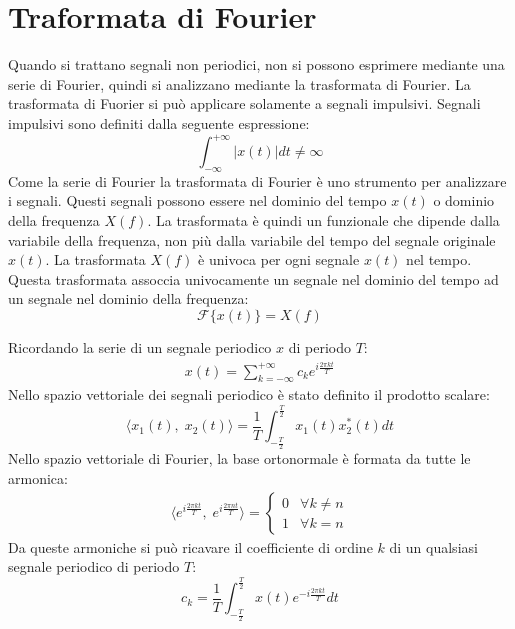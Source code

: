 \documentclass{article}
\numberwithin{equation}{subsection}
\begin{document}
\clearpage

\section{Traformata di Fourier}
Quando si trattano segnali non periodici, non si possono esprimere mediante una serie di Fourier, quindi si analizzano mediante la trasformata di Fourier. 
La trasformata di Fuorier si può applicare solamente a segnali impulsivi. Segnali impulsivi sono definiti dalla seguente espressione:
\begin{equation*}
    \displaystyle\int_{-\infty}^{+\infty}|x(t)|dt\neq\infty
\end{equation*}
Come la serie di Fourier la trasformata di Fourier è uno strumento per analizzare i segnali. Questi segnali possono essere nel dominio del tempo $x(t)$ o dominio 
della frequenza $X(f)$. La trasformata è quindi un funzionale che dipende dalla variabile della frequenza, non più dalla variabile del tempo del segnale originale $x(t)$. 
La trasformata $X(f)$ è univoca per ogni segnale $x(t)$ nel tempo. Questa trasformata assoccia univocamente un segnale nel dominio del tempo ad un segnale nel dominio della 
frequenza:   
\begin{equation*}
    \mathscr{F}\{x(t)\}=X(f)
\end{equation*}

Ricordando la serie di un segnale periodico $x$ di periodo $T$:
\begin{gather*}
    x(t)=\displaystyle\sum_{k=-\infty}^{+\infty}c_ke^{i\frac{2\pi kt}{T}}
\end{gather*}
Nello spazio vettoriale dei segnali periodico è stato definito il prodotto scalare:
\begin{equation*}
    \langle x_1(t),\;x_2(t)\rangle=\displaystyle\frac{1}{T}\int_{-\frac{T}{2}}^{\frac{T}{2}}x_1(t)x_2^*(t)dt
\end{equation*}
Nello spazio vettoriale di Fourier, la base ortonormale è formata da tutte le armonica:
\begin{gather*}
    \langle e^{i\frac{2\pi kt}{T}},\;e^{i\frac{2\pi nt}{T}}\rangle=\begin{cases}
        0&\forall k\neq n\\
        1&\forall k=n
    \end{cases}
\end{gather*} 
Da queste armoniche si può ricavare il coefficiente di ordine $k$ di un qualsiasi segnale periodico di periodo $T$:
\begin{equation*}
    c_k=\displaystyle\frac{1}{T}\int_{-\frac{T}{2}}^{\frac{T}{2}}x(t)e^{-i\frac{2\pi kt}{T}}dt
\end{equation*}
\end{document}
